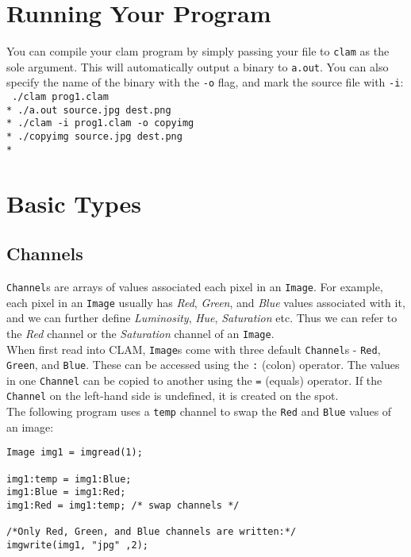 \section{Running Your Program}

You can compile your clam program by simply passing your file to \texttt{clam} as the sole argument.
This will automatically output a binary to \texttt{a.out}. You can also specify the name of
the binary with the \texttt{-o} flag, and mark the source file with \texttt{-i}:\\

\texttt{
./clam prog1.clam\\*
./a.out source.jpg dest.png\\*
./clam -i prog1.clam -o copyimg\\*
./copyimg source.jpg dest.png\\*
}

\section{Basic Types}

\subsection{Channels}

\texttt{Channel}s are arrays of values associated each pixel in an \texttt{Image}.
For example, each pixel in an \texttt{Image} usually has \emph{Red}, \emph{Green}, and \emph{Blue} values
associated with it, and we can further define \emph{Luminosity}, \emph{Hue}, \emph{Saturation} etc.
Thus we can refer to the \emph{Red} channel or the \emph{Saturation} channel of an \texttt{Image}.\\

When first read into CLAM, \texttt{Image}s come with three default \texttt{Channel}s - 
\texttt{Red}, \texttt{Green}, and \texttt{Blue}. These can be accessed using the \texttt{:} (colon) operator.
The values in one \texttt{Channel} can be copied to another using the \texttt{=} (equals) operator.
If the \texttt{Channel} on the left-hand side is undefined, it is created on the spot.\\

The following program uses a \texttt{temp} channel to swap the \texttt{Red} and \texttt{Blue} values of an image:

\begin{lstlisting}[language=CLAM,escapechar=\%]
Image img1 = imgread(1);

img1:temp = img1:Blue;
img1:Blue = img1:Red;
img1:Red = img1:temp; /* swap channels */

/*Only Red, Green, and Blue channels are written:*/
imgwrite(img1, "jpg" ,2);
\end{lstlisting}

